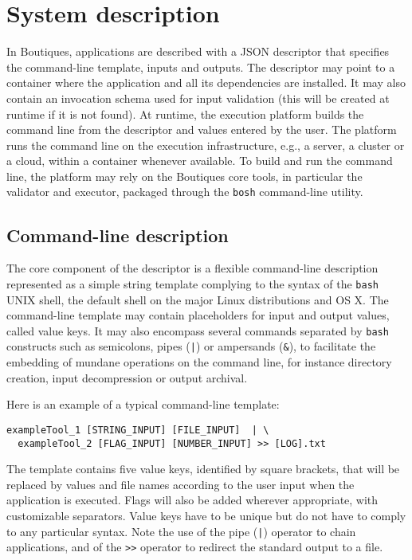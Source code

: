 \documentclass[a4paper,num-refs]{oup-contemporary}
\newcommand{\boutiques}{Boutiques\xspace}
\begin{document}
\section{System description}
\label{sec:system}

In \boutiques, applications are described with a JSON descriptor that
specifies the command-line template, inputs and outputs. The
descriptor may point to a container where the application and all its
dependencies are installed. It may also contain an invocation schema
used for input validation (this will be created at runtime if it is
not found). At runtime, the execution platform builds the command line
from the descriptor and values entered by the user. The platform runs
the command line on the execution infrastructure, e.g., a server, a
cluster or a cloud, within a container whenever available. To build
and run the command line, the platform may rely on the \boutiques core
tools, in particular the validator and executor, packaged through the
\texttt{bosh} command-line utility.

\subsection{Command-line description}

The core component of the descriptor is a flexible command-line
description represented as a simple string template complying to the
syntax of the \texttt{bash} UNIX shell, the default shell on the major
Linux distributions and OS X. The command-line template may contain
placeholders for input and output values, called value keys. It may
also encompass several commands separated by \texttt{bash} constructs
such as semicolons, pipes (\texttt{|}) or ampersands (\texttt{\&}), to
facilitate the embedding of mundane operations on the command line,
for instance directory creation, input decompression or output
archival.

Here is an example of a typical command-line template:
\begin{verbatim}
exampleTool_1 [STRING_INPUT] [FILE_INPUT]  | \
  exampleTool_2 [FLAG_INPUT] [NUMBER_INPUT] >> [LOG].txt
\end{verbatim}
The template contains five value keys, identified by square brackets,
that will be replaced by values and file names according to the user
input when the application is executed. Flags will also be added
wherever appropriate, with customizable separators. Value keys have to
be unique but do not have to comply to any particular syntax. Note the
use of the pipe (\texttt{|}) operator to chain applications, and of
the \texttt{>>} operator to redirect the standard output to a file.
\end{document}
